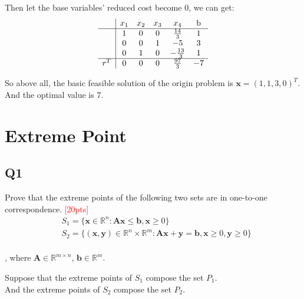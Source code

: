\documentclass[10pt]{article}
\renewcommand{\mathbf}{\boldsymbol}
\begin{document}
Then let the base variables' reduced cost become $0$, we can get:\\
\begin{equation}
	\begin{aligned}
		\begin{array}{c|ccccccc|c}
			& x_1 & x_2 & x_3 & x_4 & \text{b} \\
			\hline
			& 1 & 0 & 0 & \frac{14}{3} & 1 \\
			& 0 & 0 & 1 & -5 & 3 \\
			& 0 & 1 & 0 & -\frac{13}{3} & 1 \\
			\hline
			r^T & 0 & 0 & 0 & \frac{97}{3} & -7 \\
		\end{array}
	\end{aligned}
\end{equation}

So above all, the basic feasible solution of the origin problem is $\mathbf{x}=(1,1,3,0)^T$.\\
And the optimal value is $7$.\\

\newpage

\section{Extreme Point}
\subsection{Q1}
Prove that the extreme points of the following two sets are in one-to-one correspondence.
\textcolor{red}{[20pts]}
\begin{equation}
	\begin{aligned}
		& S_{1} = \{ \bm{x} \in \mathbb{R}^{n} : \bm{Ax} \leq \bm{b}, \bm{x} \geq 0 \} \\
		& S_{2} = \{ \bm{(x, y)} \in \mathbb{R}^{n} \times \mathbb{R}^{m} : \bm{Ax} + \bm{y} = \bm{b}, \bm{x} \geq 0, \bm{y} \geq 0 \} \\
	\end{aligned}
\end{equation}
 
, where $\bm{A} \in \mathbb{R}^{m \times n}$, $\bm{b} \in \mathbb{R}^{m}$.


Suppose that the extreme points of $S_1$ compose the set $P_1$.\\
And the extreme points of $S_2$ compose the set $P_2$.\\
\end{document}
